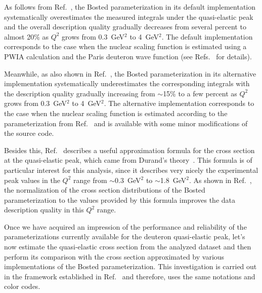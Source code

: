 As follows from Ref.~\cite{note_QE_peak}, the Bosted parameterization in its default implementation systematically overestimates the measured integrals under the quasi-elastic peak and the overall description quality gradually decreases from several percent to almost 20\% as $Q^2$ grows from 0.3~GeV$^2$ to 4~GeV$^2$. The default implementation corresponds to the case when the nuclear scaling function is estimated using a PWIA calculation and the Paris deuteron wave function (see Refs.~\cite{Bosted_fit,Bosted:2007xd} for details). 

Meanwhile, as also shown in Ref.~\cite{note_QE_peak}, the Bosted parameterization in its alternative implementation systematically underestimates the corresponding integrals with the description quality gradually increasing from $\sim$15\% to a few percent as $Q^2$ grows from 0.3~GeV$^2$ to 4~GeV$^2$. The alternative implementation corresponds to the case when the nuclear scaling function is estimated according to the parameterization from Ref.~\cite{Bodek:2014pka} and is available with some minor modifications of the source code. 


Besides this, Ref.~\cite{note_QE_peak} describes a useful approximation formula for the cross section at the quasi-elastic peak, which came from Durand's theory~\cite{Durand:1961zz}. This formula is of particular interest for this analysis, since it describes very nicely the experimental peak values in the $Q^{2}$ range from $\sim$0.3~GeV$^2$ to $\sim$1.8~GeV$^2$. As shown in Ref.~\cite{note_QE_peak}, the normalization of the cross section distributions of the Bosted parameterization to the values provided by this formula improves the data description quality in this $Q^{2}$ range.


Once we have acquired an impression of the performance and reliability of the parameterizations currently available for the deuteron quasi-elastic peak, let's now estimate the quasi-elastic cross section from the analyzed dataset and then perform its comparison with the cross section approximated by various implementations of the Bosted parameterization. This investigation is carried out in the framework established in Ref.~\cite{note_QE_peak} and therefore, uses the same notations and color codes.



